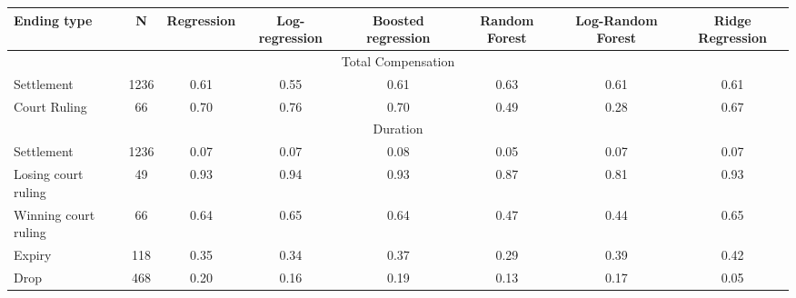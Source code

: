 \begin{tabular}{lccccccc}
\toprule
 Ending type & N & Regression & Log-regression & Boosted regression & Random Forest & Log-Random Forest & Ridge Regression \\ 
\midrule
\midrule
\multicolumn{8}{c}{Total Compensation} \\ 
\midrule
Settlement  & 1236 & 0.61 & 0.55  & 0.61 & 0.63 & \cellcolor[rgb]{ .929,  .929,  .929} 0.61 & 0.61  \\
Court Ruling   & 66   & 0.70 & \cellcolor[rgb]{ .929,  .929,  .929} 0.76  & 0.70 & 0.49 & 0.28  & 0.67  \\ 
\midrule
\multicolumn{8}{c}{Duration} \\ 
\midrule
Settlement  & 1236 & 0.07 & 0.07  & \cellcolor[rgb]{ .929,  .929,  .929} 0.08 & 0.05 & 0.07   & 0.07  \\
Losing court ruling  & 49   & \cellcolor[rgb]{ .929,  .929,  .929} 0.93 & 0.94  & 0.93 & 0.87 & 0.81   & 0.93  \\
Winning court ruling & 66   & 0.64 & 0.65  & 0.64 & 0.47 & 0.44   & \cellcolor[rgb]{ .929,  .929,  .929} 0.65  \\
Expiry & 118  & 0.35 & 0.34  & \cellcolor[rgb]{ .929,  .929,  .929} 0.37 & 0.29 & 0.39   & 0.42  \\
Drop   & 468  & 0.20 & 0.16  & 0.19 & 0.13 & \cellcolor[rgb]{ .929,  .929,  .929} 0.17   & 0.05 \\
\bottomrule 
\end{tabular}
